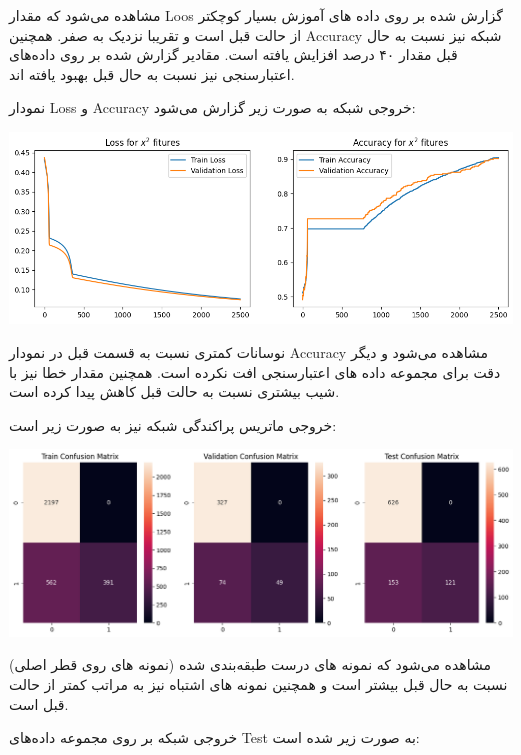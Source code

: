 \begin{enumerate}
\begin{qsolve}
				مشاهده می‌شود که مقدار Loos گزارش شده بر روی داده های آموزش بسیار کوچکتر از حالت قبل است و تقریبا نزدیک به صفر. همچنین Accuracy شبکه نیز نسبت به حال قبل مقدار ۴۰ درصد افزایش یافته است. مقادیر گزارش شده بر روی داده‌های اعتبارسنجی نیز نسبت به حال قبل بهبود یافته اند.
		
		نمودار Loss و Accuracy خروجی شبکه به صورت زیر گزارش می‌شود:
		\begin{center}
			\includegraphics*[width=1\linewidth]{pics/img11.png}
			\label{نمودار‌های خطا و دقت ۲}
		\end{center}
		
		نوسانات کمتری نسبت به قسمت قبل در نمودار Accuracy مشاهده می‌شود و دیگر دقت برای مجموعه داده های اعتبارسنجی افت نکرده است. همچنین مقدار خطا نیز با شیب بیشتری نسبت به حالت قبل کاهش پیدا کرده است.
		
		خروجی ماتریس پراکندگی شبکه نیز به صورت زیر است:
		\begin{center}
			\includegraphics*[width=1\linewidth]{pics/img12.png}
			\label{ماتریس پراکندگی ۲}
		\end{center}
		
		مشاهده می‌شود که نمونه های درست طبقه‌بندی شده (نمونه های روی قطر اصلی) نسبت به حال قبل بیشتر است و همچنین نمونه های اشتباه نیز به مراتب کمتر از حالت قبل است.
		
	\end{qsolve}
	
	
		
	\begin{qsolve}
		خروجی شبکه بر روی مجموعه داده‌های Test به صورت زیر شده است:
		

\end{qsolve}
\end{enumerate}
